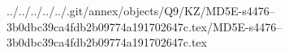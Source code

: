 ../../../../../.git/annex/objects/Q9/KZ/MD5E-s4476--3b0dbc39ca4fdb2b09774a191702647c.tex/MD5E-s4476--3b0dbc39ca4fdb2b09774a191702647c.tex